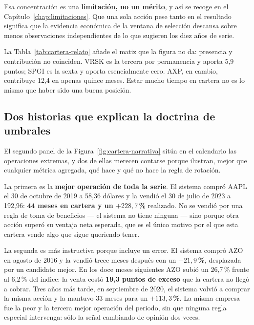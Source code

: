 Esa concentración es una \textbf{limitación, no un mérito}, y así se recoge en el
Capítulo~\ref{chap:limitaciones}. Que una sola acción pese tanto en el resultado significa que la
evidencia económica de la ventana de selección descansa sobre menos observaciones independientes de
lo que sugieren los diez años de serie.

\begin{table}[H]
  \centering
  \small
  \caption{Las diez acciones más presentes en la cartera durante la ventana de selección.}
  \label{tab:cartera-relato}
  
  \caption*{«Episodios» cuenta las veces que la acción entró en cartera: dos episodios significan
  que se vendió y se recompró más tarde. La contribución neta es a la rentabilidad de la cartera,
  no a su exceso sobre el índice.}
\end{table}

La Tabla~\ref{tab:cartera-relato} añade el matiz que la figura no da: presencia y contribución no
coinciden. VRSK es la tercera por permanencia y aporta 5,9 puntos; SPGI es la sexta y aporta
esencialmente cero. AXP, en cambio, contribuye 12,4 en apenas quince meses. Estar mucho tiempo en
cartera no es lo mismo que haber sido una buena posición.

\subsection*{Dos historias que explican la doctrina de umbrales}

El segundo panel de la Figura~\ref{fig:cartera-narrativa} sitúa en el calendario las operaciones extremas, y dos de ellas
merecen contarse porque ilustran, mejor que cualquier métrica agregada, qué hace y qué no hace la
regla de rotación.

La primera es la \textbf{mejor operación de toda la serie}. El sistema compró AAPL el 30 de octubre
de 2019 a 58,36 dólares y la vendió el 30 de julio de 2023 a 192,96: \textbf{44 meses en cartera y
un $+228{,}7$\,\%} realizado. No se vendió por una regla de toma de beneficios --- el sistema no
tiene ninguna --- sino porque otra acción superó su ventaja neta esperada, que es el único motivo
por el que esta cartera vende algo que sigue queriendo tener.

La segunda es más instructiva porque incluye un error. El sistema compró AZO en agosto de 2016 y la
vendió trece meses después con un \textbf{$-21{,}9$\,\%}, desplazada por un candidato mejor. En los
doce meses siguientes AZO subió un 26,7\,\% frente al 6,2\,\% del índice: la venta costó
\textbf{19,3 puntos de exceso} que la cartera no llegó a cobrar. Tres años más tarde, en septiembre
de 2020, el sistema volvió a comprar la misma acción y la mantuvo 33 meses para un
\textbf{$+113{,}3$\,\%}. La misma empresa fue la peor y la tercera mejor operación del periodo, sin
que ninguna regla especial intervenga: sólo la señal cambiando de opinión dos veces.

